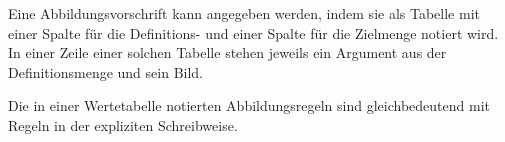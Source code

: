 \documentclass[]{uebungsblatt}
\begin{document}
\newpage
\begin{remark}{}
        
    Eine Abbildungsvorschrift kann angegeben werden, indem sie als Tabelle mit einer Spalte für die Definitions- und einer Spalte für die Zielmenge notiert wird. In einer Zeile einer solchen Tabelle stehen jeweils ein Argument aus der Definitionsmenge und sein Bild.
    
    Die in einer Wertetabelle notierten Abbildungsregeln sind gleichbedeutend mit Regeln in der expliziten Schreibweise.
\end{remark}
\end{document}
